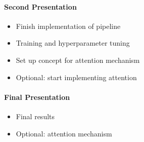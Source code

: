 \documentclass[10pt,twocolumn,letterpaper]{article}
\begin{document}
\paragraph{Second Presentation}
\begin{itemize}
	\setlength\itemsep{0em}
	\item Finish implementation of pipeline
	\item Training and hyperparameter tuning
	\item Set up concept for attention mechanism
	\item Optional: start implementing attention
\end{itemize}

\paragraph{Final Presentation}
\begin{itemize}
	\setlength\itemsep{0em}
	\item Final results
	\item Optional: attention mechanism
\end{itemize}

{\small


}
\end{document}
